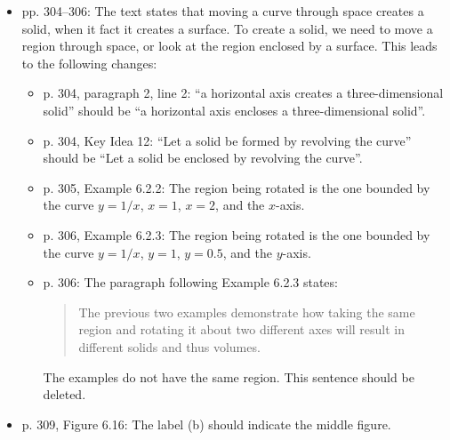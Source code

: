 \documentclass{amsart}
\begin{document}
\begin{itemize}
\item pp. 304--306: The text states that moving a curve through space creates a solid, when it fact it creates a surface. To create a solid, we need to move a region through space, or look at the region enclosed by a surface. This leads to the following changes:
\begin{itemize}
\item p. 304, paragraph 2, line 2: ``a horizontal axis creates a three-dimensional solid'' should be ``a horizontal axis encloses a three-dimensional solid''.
\item p. 304, Key Idea 12: ``Let a solid be formed by revolving the curve'' should be ``Let a solid be enclosed by revolving the curve''.
\item p. 305, Example 6.2.2: The region being rotated is the one bounded by the curve $y=1/x$, $x=1$, $x=2$, and the $x$-axis.
\item p. 306, Example 6.2.3: The region being rotated is the one bounded by the curve $y=1/x$, $y=1$, $y=0.5$, and the $y$-axis.
\item p. 306: The paragraph following Example 6.2.3 states:
\begin{quote}
The previous two examples demonstrate how taking the same region and rotating it about two different axes will result in different solids and thus volumes.
\end{quote}
The examples do not have the same region. This sentence should be deleted.
\end{itemize}
\item p. 309, Figure 6.16: The label (b) should indicate the middle figure.
\end{itemize}
\end{document}
